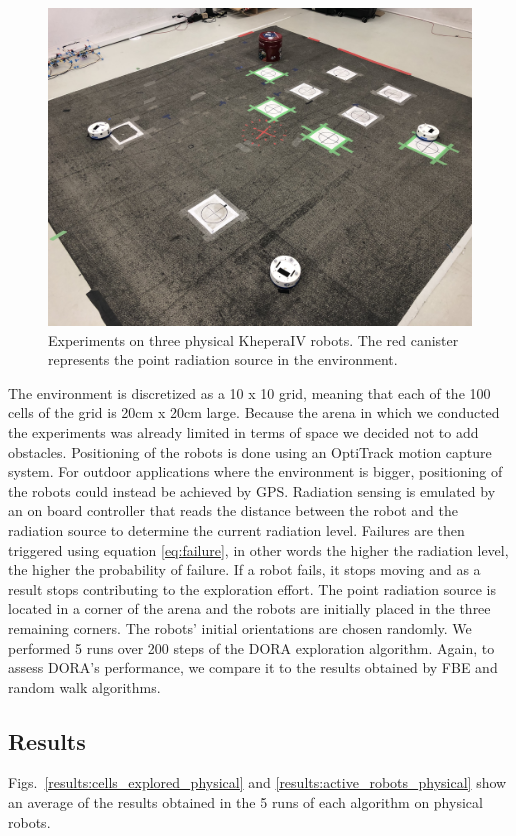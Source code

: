 \documentclass[letterpaper, 10 pt, conference]{ieeeconf}
\begin{document}
\begin{figure}[h]
    \centering
    \captionsetup{belowskip=-20pt}
    \includegraphics[width=0.65\columnwidth]{images/arena.jpeg}
    \caption{Experiments on three physical KheperaIV robots. The red canister represents the point radiation source in the environment.}
    \label{arena}
\end{figure}

The environment is discretized as a 10 x 10 grid, meaning that each of
the 100 cells of the grid is 20cm x 20cm large. Because the arena in
which we conducted the experiments was already limited in terms of
space we decided not to add obstacles. 
Positioning of the
robots is done using an OptiTrack motion capture system. For outdoor
applications where the environment is bigger, positioning of the
robots could instead be achieved by GPS. Radiation sensing is emulated
by an on board controller that reads the distance between the robot
and the radiation source to determine the current radiation
level. Failures are then triggered using equation \eqref{eq:failure},
in other words the higher the radiation level, the higher the
probability of failure. If a robot fails, it stops moving and as a
result stops contributing to the exploration effort. The point
radiation source is located in a corner of the arena and the robots
are initially placed in the three remaining corners. The robots'
initial orientations are chosen randomly.  We performed 5 runs over
200 steps of the DORA exploration algorithm. Again, to assess DORA's
performance, we compare it to the results obtained by FBE and random
walk algorithms.


\subsection{Results}
Figs.~\ref{results:cells_explored_physical} and
\ref{results:active_robots_physical} show an average of the results
obtained in the 5 runs of each algorithm on physical robots.
\end{document}
